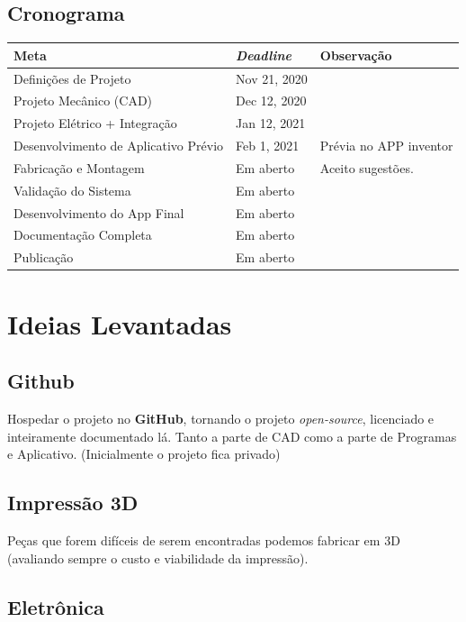 \documentclass[a4paper, 12pt]{article}
\begin{document}
\subsection{Cronograma}

\begin{table}[htb]
	\begin{tabular}{l|l|l}
	
Meta & \textit{Deadline} & Observação \\ \hline\hline
Definições de Projeto &	Nov 21, 2020&	\\\hline
Projeto Mecânico (CAD)&	Dec 12, 2020	&\\\hline
Projeto Elétrico + Integração&	Jan 12, 2021&	\\\hline
Desenvolvimento de Aplicativo Prévio&	Feb 1, 2021&	Prévia no APP inventor\\\hline
Fabricação e Montagem& Em aberto & Aceito sugestões. \\\hline
Validação do Sistema&		Em aberto&\\\hline
Desenvolvimento do App Final&		Em aberto&\\\hline
Documentação Completa&		Em aberto&\\\hline
Publicação&	Em aberto&\\

\end{tabular}
\end{table}


\section{Ideias Levantadas}


\subsection{Github}

Hospedar o projeto no \textbf{GitHub}, tornando o projeto \textit{open-source}, licenciado e inteiramente documentado lá. Tanto a parte de CAD como a parte de Programas e Aplicativo. (Inicialmente o projeto fica privado)

\subsection{Impressão 3D}

Peças que forem difíceis de serem encontradas podemos fabricar em 3D (avaliando sempre o custo e viabilidade da impressão). 

\subsection{Eletrônica}
\end{document}
